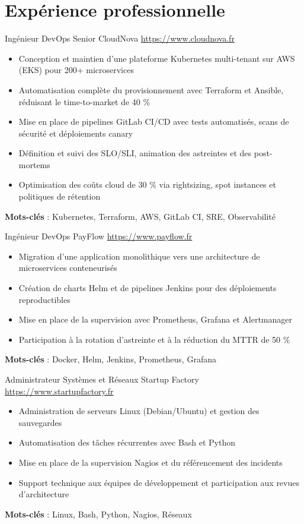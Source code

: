 \documentclass[a4paper, serif, 10pt]{moderncv}
\begin{document}
\section{Expérience professionnelle}

        {Ingénieur DevOps Senior}
        {CloudNova}
        {\url{https://www.cloudnova.fr}}
        {}
        {\begin{itemize}
\item Conception et maintien d'une plateforme Kubernetes multi-tenant sur AWS (EKS) pour 200+ microservices
\item Automatisation complète du provisionnement avec Terraform et Ansible, réduisant le time-to-market de 40 \%
\item Mise en place de pipelines GitLab CI/CD avec tests automatisés, scans de sécurité et déploiements canary
\item Définition et suivi des SLO/SLI, animation des astreintes et des post-mortems
\item Optimisation des coûts cloud de 30 \% via rightsizing, spot instances et politiques de rétention
\end{itemize}
\textbf{Mots-clés} : Kubernetes, Terraform, AWS, GitLab CI, SRE, Observabilité}

        {Ingénieur DevOps}
        {PayFlow}
        {\url{https://www.payflow.fr}}
        {}
        {\begin{itemize}
\item Migration d'une application monolithique vers une architecture de microservices conteneurisés
\item Création de charts Helm et de pipelines Jenkins pour des déploiements reproductibles
\item Mise en place de la supervision avec Prometheus, Grafana et Alertmanager
\item Participation à la rotation d'astreinte et à la réduction du MTTR de 50 \%
\end{itemize}
\textbf{Mots-clés} : Docker, Helm, Jenkins, Prometheus, Grafana}

        {Administrateur Systèmes et Réseaux}
        {Startup Factory}
        {\url{https://www.startupfactory.fr}}
        {}
        {\begin{itemize}
\item Administration de serveurs Linux (Debian/Ubuntu) et gestion des sauvegardes
\item Automatisation des tâches récurrentes avec Bash et Python
\item Mise en place de la supervision Nagios et du référencement des incidents
\item Support technique aux équipes de développement et participation aux revues d'architecture
\end{itemize}
\textbf{Mots-clés} : Linux, Bash, Python, Nagios, Réseaux}
\end{document}
